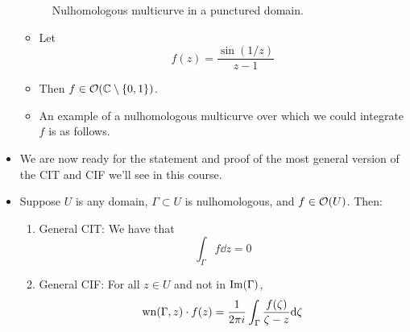 \documentclass[../notes.tex]{subfiles}
\begin{document}
\begin{itemize}
\begin{figure}[h!]
        \caption{Nulhomologous multicurve in a punctured domain.}
        \label{fig:nulhomPuncture}
    \end{figure}
    \begin{itemize}
        \item Let
        \begin{equation*}
            f(z) = \frac{\sin(1/z)}{z-1}
        \end{equation*}
        \item Then $f\in\mathcal{O}(\mathbb{C}\setminus\{0,1\})$.
        \item An example of a nulhomologous multicurve over which we could integrate $f$ is as follows.
    \end{itemize}
    \item We are now ready for the statement and proof of the most general version of the CIT and CIF we'll see in this course.
    \item Suppose $U$ is any domain, $\Gamma\subset U$ is nulhomologous, and $f\in\mathcal{O}(U)$. Then:
    \begin{enumerate}
        \item General CIT: We have that
        \begin{equation*}
            \int_\Gamma f\dd{z} = 0
        \end{equation*}
        \item General CIF: For all $z\in U$ and not in $\operatorname{Im}(\Gamma)$,
        \begin{equation*}
            \wn(\Gamma,z)\cdot f(z) = \frac{1}{2\pi i}\int_\Gamma\frac{f(\zeta)}{\zeta-z}\dd\zeta

\end{equation*}
\end{enumerate}
\end{itemize}
\end{document}
